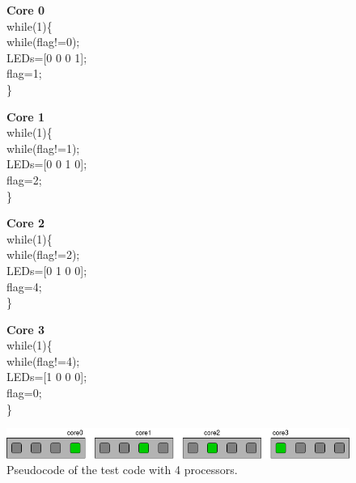 \begin{figure}[htbp]
\centering
\begin{minipage}[t][3cm][t]{3.2cm}
\textbf{Core 0}\\
while(1)\{\\
\hspace*{.4cm}while(flag!=0);\\
\hspace*{.4cm}LEDs=[0 0 0 1];\\
\hspace*{.4cm}flag=1;\\
\}
\end{minipage}\hspace{.5cm}
\begin{minipage}[t][3cm][t]{3.2cm}
\textbf{Core 1}\\
while(1)\{\\
\hspace*{.4cm}while(flag!=1);\\
\hspace*{.4cm}LEDs=[0 0 1 0];\\
\hspace*{.4cm}flag=2;\\
\}
\end{minipage}\hspace{.5cm}
\begin{minipage}[t][3cm][t]{3.2cm}
\textbf{Core 2}\\
while(1)\{\\
\hspace*{.4cm}while(flag!=2);\\
\hspace*{.4cm}LEDs=[0 1 0 0];\\
\hspace*{.4cm}flag=4;\\
\}
\end{minipage}\hspace{.5cm}
\begin{minipage}[t][3cm][t]{3.2cm}
\textbf{Core 3}\\
while(1)\{\\
\hspace*{.4cm}while(flag!=4);\\
\hspace*{.4cm}LEDs=[1 0 0 0];\\
\hspace*{.4cm}flag=0;\\
\}
\end{minipage}
\includegraphics[width=.72\textwidth]{images/leds4_fig.png}
\caption{Pseudocode of the test code with 4 processors.}
\label{4LED-code}
\end{figure}

